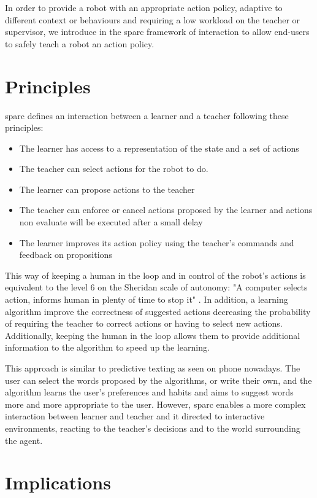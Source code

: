 In order to provide a robot with an appropriate action policy, adaptive to different context or behaviours and requiring a low workload on the teacher or supervisor, we introduce in \cite{senft2015sparc} the \acrfull{sparc} framework of interaction to allow end-users to safely teach a robot an action policy.

\section{Principles}

\gls{sparc} defines an interaction between a learner and a teacher following these principles:
\begin{itemize}
	\item The learner has access to a representation of the state and a set of actions
	\item The teacher can select actions for the robot to do.
	\item The learner can propose actions to the teacher
	\item The teacher can enforce or cancel actions proposed by the learner and actions non evaluate will be executed after a small delay
	\item The learner improves its action policy using the teacher's commands and feedback on propositions
\end{itemize} 

This way of keeping a human in the loop and in control of the robot's actions is equivalent to the level 6 on the Sheridan scale of autonomy: "A computer selects action, informs human in plenty of time to stop it" \citep{sheridan1978human}. In addition, a learning algorithm improve the correctness of suggested actions decreasing the probability of requiring the teacher to correct actions or having to select new actions. Additionally, keeping the human in the loop allows them to provide additional information to the algorithm to speed up the learning.

This approach is similar to predictive texting as seen on phone nowadays. The user can select the words proposed by the algorithms, or write their own, and the algorithm learns the user's preferences and habits and aims to suggest words more and more appropriate to the user. However, \gls{sparc} enables a more complex interaction between learner and teacher and it directed to interactive environments, reacting to the teacher's decisions and to the world surrounding the agent.
    
\section{Implications}

